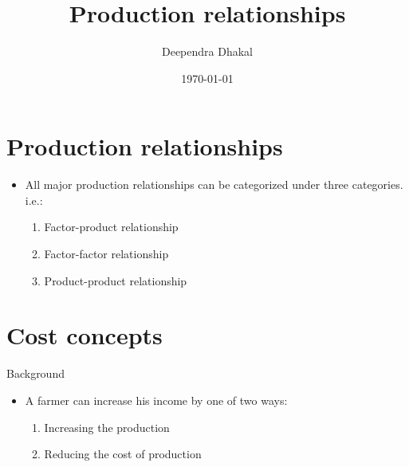 \documentclass[12pt,ignorenonframetext,aspectratio=169]{beamer}
\title{\insertsectionhead}
  {
    \definecolor{white}{rgb}{0.776,0.357,0.157}
    \definecolor{iqss@orange}{rgb}{1,1,1}
    \ifnum \insertmainframenumber > \insertframenumber
    \frame{
      \frametitle{\iqsssectiontitleheader}
      \tableofcontents[currentsection]
    }
    \else
    \frame{
      \frametitle{Backup Slides}
      \tableofcontents[sectionstyle=shaded/shaded,subsectionstyle=shaded/shaded/shaded]
    }
    \fi
  }
\title[]{Production relationships}
\author[
        Deependra Dhakal
    ]{Deependra Dhakal}
\institute[
    ]{
    GAASC, Baitadi \and Tribhuwan University
    }
\date[
      \today
  ]{
      \today
        }
\providecommand{\tightlist}{%
  \setlength{\itemsep}{0pt}\setlength{\parskip}{0pt}}
\begin{document}
  \begin{frame}[plain]
  \titlepage
  \end{frame}



\hypertarget{production-relationships}{%
\section{Production relationships}\label{production-relationships}}

\begin{frame}{}
\protect\hypertarget{section}{}
\begin{itemize}
\tightlist
\item
  All major production relationships can be categorized under three
  categories. i.e.:

  \begin{enumerate}
  \tightlist
  \item
    Factor-product relationship
  \item
    Factor-factor relationship
  \item
    Product-product relationship
  \end{enumerate}
\end{itemize}
\end{frame}

\hypertarget{cost-concepts}{%
\section{Cost concepts}\label{cost-concepts}}

\begin{frame}{Background}
\protect\hypertarget{background}{}
\begin{itemize}
\tightlist
\item
  A farmer can increase his income by one of two ways:

  \begin{enumerate}
  \tightlist
  \item
    Increasing the production
  \item
    Reducing the cost of production
  \end{enumerate}
\end{itemize}
\end{frame}
\end{document}
